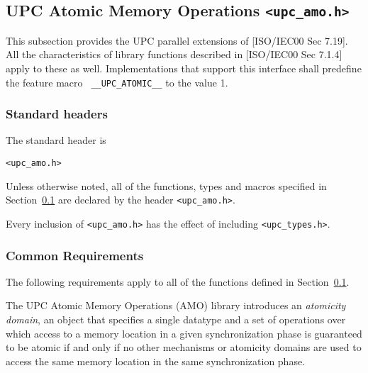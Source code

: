 \subsection{UPC Atomic Memory Operations {\tt <upc\_amo.h>}}
\label{upc-amo}

\npf This subsection provides the UPC parallel extensions of [ISO/IEC00 
    Sec 7.19].  All the characteristics of library functions described
    in [ISO/IEC00 Sec 7.1.4] apply to these as well.  Implementations
    that support this interface shall predefine the feature macro {\tt
    \_\_UPC\_ATOMIC\_\_} to the value 1.


\subsubsection{Standard headers}

\np The standard header is

{\tt <upc\_amo.h>}

\np Unless otherwise noted, all of the functions, types and macros specified
    in Section~\ref{upc-amo} are declared by the header {\tt <upc\_amo.h>}.

\np Every inclusion of {\tt <upc\_amo.h>} has the effect of including
    {\tt <upc\_types.h>}.

\subsubsection{Common Requirements}
\label{upc-amo-reqs}
\npf The following requirements apply to all of the functions defined
     in Section~\ref{upc-amo}.

\np The UPC Atomic Memory Operations (AMO) library introduces an
    \emph{atomicity domain}, an object that specifies a single datatype and
    a set of operations over which access to a memory location in a given
    synchronization phase is guaranteed to be atomic if and only if no other
    mechanisms or atomicity domains are used to access the same memory
    location in the same synchronization phase.

